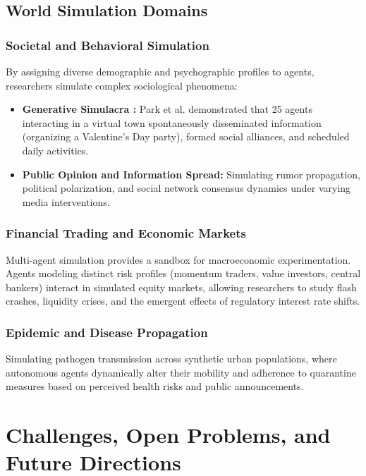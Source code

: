 \documentclass[12pt,a4paper]{report}
\begin{document}
\section{World Simulation Domains}

\subsection{Societal and Behavioral Simulation}
By assigning diverse demographic and psychographic profiles to agents, researchers simulate complex sociological phenomena:
\begin{itemize}
    \item \textbf{Generative Simulacra \cite{park2023generative}:} Park et al. demonstrated that 25 agents interacting in a virtual town spontaneously disseminated information (organizing a Valentine's Day party), formed social alliances, and scheduled daily activities.
    \item \textbf{Public Opinion and Information Spread:} Simulating rumor propagation, political polarization, and social network consensus dynamics under varying media interventions.
\end{itemize}

\subsection{Financial Trading and Economic Markets}
Multi-agent simulation provides a sandbox for macroeconomic experimentation. Agents modeling distinct risk profiles (momentum traders, value investors, central bankers) interact in simulated equity markets, allowing researchers to study flash crashes, liquidity crises, and the emergent effects of regulatory interest rate shifts.

\subsection{Epidemic and Disease Propagation}
Simulating pathogen transmission across synthetic urban populations, where autonomous agents dynamically alter their mobility and adherence to quarantine measures based on perceived health risks and public announcements.


\chapter{Challenges, Open Problems, and Future Directions}
\label{chap:challenges}
\end{document}
